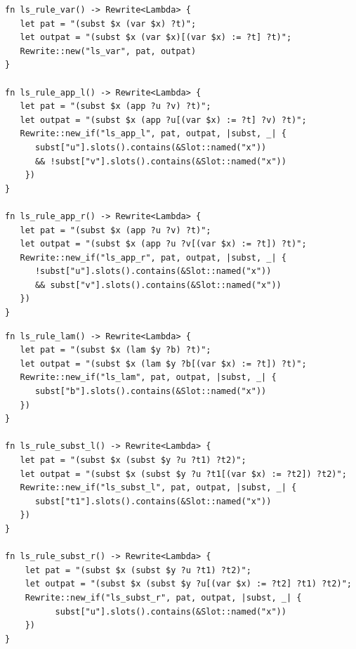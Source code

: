 \clearpage

\begin{listing*}
	\centering
\begin{minipage}{0.8\textwidth}
	\begin{verbatim}
fn ls_rule_var() -> Rewrite<Lambda> {
   let pat = "(subst $x (var $x) ?t)";
   let outpat = "(subst $x (var $x)[(var $x) := ?t] ?t)";
   Rewrite::new("ls_var", pat, outpat)
}

fn ls_rule_app_l() -> Rewrite<Lambda> {
   let pat = "(subst $x (app ?u ?v) ?t)";
   let outpat = "(subst $x (app ?u[(var $x) := ?t] ?v) ?t)";
   Rewrite::new_if("ls_app_l", pat, outpat, |subst, _| {
      subst["u"].slots().contains(&Slot::named("x")) 
	  && !subst["v"].slots().contains(&Slot::named("x"))
    })
}

fn ls_rule_app_r() -> Rewrite<Lambda> {
   let pat = "(subst $x (app ?u ?v) ?t)";
   let outpat = "(subst $x (app ?u ?v[(var $x) := ?t]) ?t)";
   Rewrite::new_if("ls_app_r", pat, outpat, |subst, _| {
      !subst["u"].slots().contains(&Slot::named("x")) 
	  && subst["v"].slots().contains(&Slot::named("x"))
   })
}
	\end{verbatim}
\end{minipage}
	\caption{$\lambda_{\text{lsub}}$ $ls$-rules (part 1).}
	\label{listing:lsub_ls_rules-1}
\end{listing*}

\begin{listing*}
	\centering
\begin{minipage}{0.8\textwidth}
	\begin{verbatim}
fn ls_rule_lam() -> Rewrite<Lambda> {
   let pat = "(subst $x (lam $y ?b) ?t)";
   let outpat = "(subst $x (lam $y ?b[(var $x) := ?t]) ?t)";
   Rewrite::new_if("ls_lam", pat, outpat, |subst, _| {
      subst["b"].slots().contains(&Slot::named("x"))
   })
}

fn ls_rule_subst_l() -> Rewrite<Lambda> {
   let pat = "(subst $x (subst $y ?u ?t1) ?t2)";
   let outpat = "(subst $x (subst $y ?u ?t1[(var $x) := ?t2]) ?t2)";
   Rewrite::new_if("ls_subst_l", pat, outpat, |subst, _| {
      subst["t1"].slots().contains(&Slot::named("x"))
   })
}

fn ls_rule_subst_r() -> Rewrite<Lambda> {
    let pat = "(subst $x (subst $y ?u ?t1) ?t2)";
    let outpat = "(subst $x (subst $y ?u[(var $x) := ?t2] ?t1) ?t2)";
    Rewrite::new_if("ls_subst_r", pat, outpat, |subst, _| {
          subst["u"].slots().contains(&Slot::named("x"))
    })
}
	\end{verbatim}
\end{minipage}
	\caption{$\lambda_{\text{lsub}}$ $ls$-rules (part 2).}
	\label{listing:lsub_ls_rules-2}
\end{listing*}

